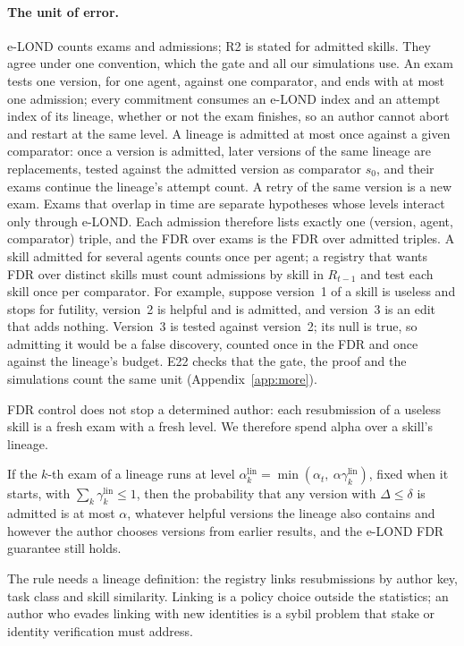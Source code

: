 \paragraph{The unit of error.} e-LOND counts exams and admissions; R2 is stated for admitted skills. They agree under one convention, which the gate and all our simulations use. An exam tests one version, for one agent, against one comparator, and ends with at most one admission; every commitment consumes an e-LOND index and an attempt index of its lineage, whether or not the exam finishes, so an author cannot abort and restart at the same level. A lineage is admitted at most once against a given comparator: once a version is admitted, later versions of the same lineage are replacements, tested against the admitted version as comparator $s_0$, and their exams continue the lineage's attempt count. A retry of the same version is a new exam. Exams that overlap in time are separate hypotheses whose levels interact only through e-LOND. Each admission therefore lists exactly one (version, agent, comparator) triple, and the FDR over exams is the FDR over admitted triples. A skill admitted for several agents counts once per agent; a registry that wants FDR over distinct skills must count admissions by skill in $R_{t-1}$ and test each skill once per comparator. For example, suppose version~1 of a skill is useless and stops for futility, version~2 is helpful and is admitted, and version~3 is an edit that adds nothing. Version~3 is tested against version~2; its null is true, so admitting it would be a false discovery, counted once in the FDR and once against the lineage's budget. E22 checks that the gate, the proof and the simulations count the same unit (Appendix~\ref{app:more}).

FDR control does not stop a determined author: each resubmission of a useless skill is a fresh exam with a fresh level. We therefore spend alpha over a skill's lineage.
\begin{proposition}\label{prop:lineage}
If the $k$-th exam of a lineage runs at level $\alpha_k^{\text{lin}}=\min(\alpha_t,\ \alpha\gamma^{\text{lin}}_k)$, fixed when it starts, with $\sum_k\gamma^{\text{lin}}_k\le1$, then the probability that any version with $\Delta\le\delta$ is admitted is at most $\alpha$, whatever helpful versions the lineage also contains and however the author chooses versions from earlier results, and the e-LOND FDR guarantee still holds.
\end{proposition}
The rule needs a lineage definition: the registry links resubmissions by author key, task class and skill similarity. Linking is a policy choice outside the statistics; an author who evades linking with new identities is a sybil problem that stake or identity verification must address.

